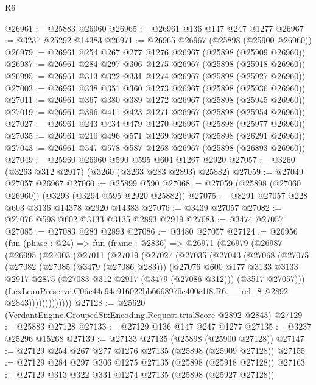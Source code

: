 \begin{lexlean}{R6}
\begin{coremodule}
@26961 := @25883 @26960
@26965 := @26961 @136 @147 @247 @1277
@26967 := @3237 @25292 @14383
@26971 := @26965 @26967 (@25898 (@25900 @26960))
@26979 := @26961 @254 @267 @277 @1276 @26967 (@25898 (@25909 @26960))
@26987 := @26961 @284 @297 @306 @1275 @26967 (@25898 (@25918 @26960))
@26995 := @26961 @313 @322 @331 @1274 @26967 (@25898 (@25927 @26960))
@27003 := @26961 @338 @351 @360 @1273 @26967 (@25898 (@25936 @26960))
@27011 := @26961 @367 @380 @389 @1272 @26967 (@25898 (@25945 @26960))
@27019 := @26961 @396 @411 @423 @1271 @26967 (@25898 (@25954 @26960))
@27027 := @26961 @243 @434 @479 @1270 @26967 (@25898 (@25977 @26960))
@27035 := @26961 @210 @496 @571 @1269 @26967 (@25898 (@26291 @26960))
@27043 := @26961 @547 @578 @587 @1268 @26967 (@25898 (@26893 @26960))
@27049 := @25960 @26960 @590 @595 @604 @1267 @2920
@27057 := @3260 (@3263 @312 @2917) (@3260 (@3263 @283 @2893) @25882)
@27059 := @27049 @27057 @26967
@27060 := @25899 @590
@27068 := @27059 (@25898 (@27060 @26960)) (@3293 (@3294 @595 @2920 @25882))
@27075 := @8291 @27057 @228 @603 @3136 @14378 @2920 @14383
@27076 := @3439 @27057
@27082 := @27076 @598 @602 @3133 @3135 @2893 @2919
@27083 := @3474 @27057
@27085 := @27083 @283 @2893
@27086 := @3480 @27057
@27124 := @26956
    (fun (phase : @24) =>
    fun (frame : @2836) =>
    @26971
      (@26979
        (@26987
          (@26995
            (@27003
              (@27011
                (@27019
                  (@27027
                    (@27035
                      (@27043
                        (@27068
                          (@27075
                            (@27082
                              (@27085 (@3479 (@27086 @283)))
                              (@27076
                                @600
                                @177
                                @3133
                                @3133
                                @2917
                                @2875
                                (@27083 @312 @2917 (@3479 (@27086 @312)))
                                (@3517 @27057)))
                            (LexLeanPreserve.C06c44e94c916022bb6668970c400c1f8.R6.__rel_8
                              @2892
                              @2843)))))))))))))
@27128 := @25620 (VerdantEngine.GroupedSixEncoding.Request.trialScore @2892 @2843)
@27129 := @25883 @27128
@27133 := @27129 @136 @147 @247 @1277
@27135 := @3237 @25296 @15268
@27139 := @27133 @27135 (@25898 (@25900 @27128))
@27147 := @27129 @254 @267 @277 @1276 @27135 (@25898 (@25909 @27128))
@27155 := @27129 @284 @297 @306 @1275 @27135 (@25898 (@25918 @27128))
@27163 := @27129 @313 @322 @331 @1274 @27135 (@25898 (@25927 @27128))

\end{coremodule}
\end{lexlean}
